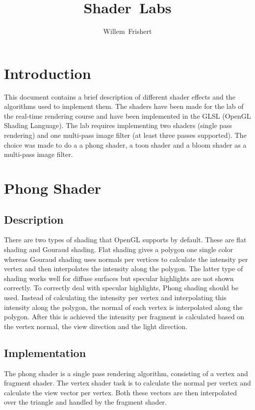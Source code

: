 \documentclass[a4paper,12pt]{article}
\author{Willem~Frishert}
\title{Shader~Labs}
\begin{document}
\pagestyle{headings}
\maketitle

\section{Introduction}
\label{sec:Introduction}
This document contains a brief description of different shader effects and the algorithms used to implement them. The shaders have been made for the lab of the real-time rendering course and have been implemented in the GLSL (OpenGL Shading Language). The lab requires implementing two shaders (single pass rendering) and one multi-pass image filter (at least three passes supported). The choice was made to do a a phong shader, a toon shader and a bloom shader as a multi-pass image filter.

\section{Phong Shader}
\label{sec:PhongShader}
\subsection{Description}
\label{sec:Description}

There are two types of shading that OpenGL supports by default. These are flat shading and Gouraud shading. Flat shading gives a polygon one single color whereas Gouraud shading uses normals per vertices to calculate the intensity per vertex and then interpolates the intensity along the polygon. The latter type of shading works well for diffuse surfaces but specular highlights are not shown correctly. To correctly deal with specular highlights, Phong shading should be used. Instead of calculating the intensity per vertex and interpolating this intensity along the polygon, the normal of each vertex is interpolated along the polygon. After this is achieved the intensity per fragment is calculated based on the vertex normal, the view direction and the light direction.


\subsection{Implementation}
\label{sec:ImplementationPhongShader}

The phong shader is a single pass rendering algorithm, consisting of a vertex and fragment shader. The vertex shader task is to calculate the normal per vertex and calculate the view vector per vertex. Both these vectors are then interpolated over the triangle and handled by the fragment shader.
\end{document}
